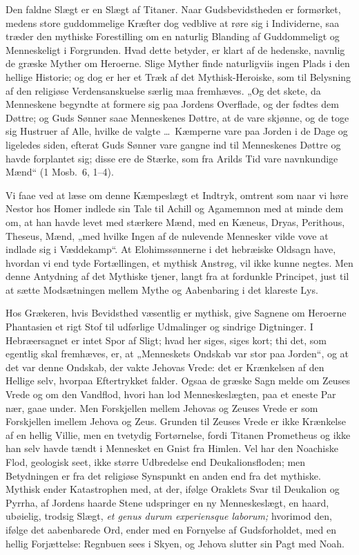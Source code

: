 \documentclass[12pt]{book}
\begin{document}
Den faldne Slægt er en Slægt af Titaner. Naar Gudsbevidstheden er
formørket, medens store guddommelige Kræfter dog vedblive at røre
sig i Individerne, saa træder den mythiske Forestilling om en
naturlig Blanding af Guddommeligt og Menneskeligt i Forgrunden.
Hvad dette betyder, er klart af de hedenske, navnlig de græske
Myther om Heroerne. Slige Myther finde naturligviis ingen Plads i
den hellige Historie; og dog er her et Træk af det
Mythisk-Heroiske, som til Belysning af den religiøse
Verdensanskuelse særlig maa fremhæves. „Og det skete, da Menneskene
begyndte at formere sig paa Jordens Overflade, og der fødtes dem
Døttre; og Guds Sønner saae Menneskenes Døttre, at de vare skjønne,
og
de toge sig Hustruer af Alle, hvilke de valgte \dots\ Kæmperne vare
paa Jorden i de Dage og ligeledes siden, efterat Guds Sønner vare
gangne ind til Menneskenes Døttre og havde forplantet sig; disse ere
de Stærke, som fra Arilds Tid vare navnkundige Mænd“ (1 Mosb.\ 6,
1--4).

Vi faae ved at læse om denne Kæmpeslægt et Indtryk, omtrent som naar
vi høre Nestor hos Homer indlede sin Tale til Achill og Agamemnon
med at minde dem om, at han havde levet med stærkere Mænd, med en
Kæneus, Dryas, Perithous, Theseus, Mænd, „med hvilke Ingen af de
nulevende Mennesker vilde vove at indlade sig i Væddekamp“. At
Elohimssønnerne i det hebræiske Oldsagn have, hvordan vi end tyde
Fortællingen, et mythisk Anstrøg, vil ikke kunne negtes. Men denne
Antydning af det Mythiske tjener, langt fra at fordunkle Principet,
just til at sætte Modsætningen mellem Mythe og Aabenbaring i det
klareste Lys.

Hos Grækeren, hvis Bevidsthed væsentlig er mythisk, give Sagnene om
Heroerne Phantasien et rigt Stof til udførlige Udmalinger og
sindrige Digtninger. I Hebræersagnet er intet Spor af Sligt; hvad
her siges, siges kort; thi det, som egentlig skal fremhæves, er, at
„Menneskets Ondskab var stor paa Jorden“, og at det var denne
Ondskab, der vakte Jehovas Vrede: det er Krænkelsen af den Hellige
selv, hvorpaa Eftertrykket falder. Ogsaa de græske Sagn melde om
Zeuses Vrede og om den Vandflod, hvori han lod Menneskeslægten, paa
et eneste Par nær, gaae under. Men Forskjellen mellem Jehovas og
Zeuses Vrede er som Forskjellen imellem Jehova og Zeus. Grunden til
Zeuses Vrede er ikke Krænkelse af en hellig Villie, men en tvetydig
Fortørnelse, fordi Titanen Prometheus og ikke han selv havde tændt i
Mennesket en Gnist fra Himlen. Vel har den Noachiske Flod, geologisk
seet, ikke større Udbredelse end Deukalionsfloden; men Betydningen
er fra det religiøse Synspunkt en anden end
fra det mythiske. Mythisk ender Katastrophen med, at der, ifølge
Oraklets Svar til Deukalion og Pyrrha, af Jordens haarde Stene
udspringer en ny Menneskeslægt, en haard, ubøielig, trodsig Slægt,
\textit{et genus durum experiensque laborum;} hvorimod den, ifølge
det aabenbarede Ord, ender med en Fornyelse af Gudsforholdet, med en
hellig Forjættelse: Regnbuen sees i Skyen, og Jehova slutter sin
Pagt med Noah.
\end{document}
